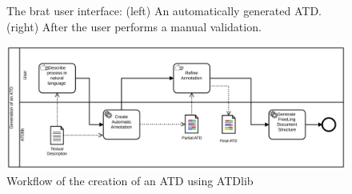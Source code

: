\begin{figure}[htb]
\begin{minipage}{0.49\textwidth}
  \end{minipage}
  \caption{The brat user interface: (left) An automatically generated
    ATD. (right) After the user performs a manual validation.}
  \label{fig:brat_example}
\end{figure}


\begin{figure}[htb]
  \centering
  \includegraphics[width=\textwidth]{figures/atdlib_bpmn}
  \caption{Workflow of the creation of an ATD using ATDlib}
  \label{fig:atdlib_process}
\end{figure}